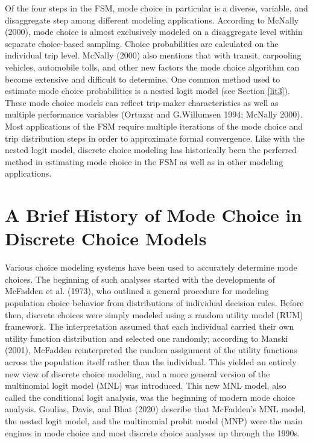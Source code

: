 \documentclass[12pt, oneside, openright]{byuthesis}
\begin{document}
Of the four steps in the FSM, mode choice in particular is a diverse, variable, and disaggregate step among different modeling applications. According to McNally (2000), mode choice is almost exclusively modeled on a disaggregate level within separate choice-based sampling. Choice probabilities are calculated on the individual trip level. McNally (2000) also mentions that with transit, carpooling vehicles, automobile tolls, and other new factors the mode choice algorithm can become extensive and difficult to determine. One common method used to estimate mode choice probabilities is a nested logit model (see Section \ref{lit3}). These mode choice models can reflect trip-maker characteristics as well as multiple performance variables (Ortuzar and G.Willumsen 1994; McNally 2000). Most applications of the FSM require multiple iterations of the mode choice and trip distribution steps in order to approximate formal convergence. Like with the nested logit model, discrete choice modeling has historically been the perferred method in estimating mode choice in the FSM as well as in other modeling applications.

\hypertarget{lit2}{%
\section{A Brief History of Mode Choice in Discrete Choice Models}\label{lit2}}

Various choice modeling systems have been used to accurately determine mode choices. The beginning of such analyses started with the developments of McFadden et al. (1973), who outlined a general procedure for modeling population choice behavior from distributions of individual decision rules. Before then, discrete choices were simply modeled using a random utility model (RUM) framework. The interpretation assumed that each individual carried their own utility function distribution and selected one randomly; according to Manski (2001), McFadden reinterpreted the random assignment of the utility functions across the population itself rather than the individual. This yielded an entirely new view of discrete choice modeling, and a more general version of the multinomial logit model (MNL) was introduced. This new MNL model, also called the conditional logit analysis, was the beginning of modern mode choice analysis. Goulias, Davis, and Bhat (2020) describe that McFadden's MNL model, the nested logit model, and the multinomial probit model (MNP) were the main engines in mode choice and most discrete choice analyses up through the 1990s.
\end{document}
